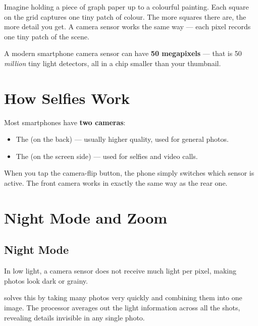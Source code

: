 \begin{picturethis}
  Imagine holding a piece of graph paper up to a colourful painting.
  Each square on the grid captures one tiny patch of colour.
  The more squares there are, the more detail you get.
  A camera sensor works the same way — each pixel records one tiny
  patch of the scene.
\end{picturethis}

\begin{funfact}
  A modern smartphone camera sensor can have \textbf{50 megapixels} —
  that is 50 \emph{million} tiny light detectors, all in a chip smaller
  than your thumbnail.
\end{funfact}

\sectionrule

\section*{How Selfies Work}

Most smartphones have \textbf{two cameras}:
\begin{itemize}
  \item The  (on the back) — usually higher quality, used for general photos.
  \item The  (on the screen side) — used for selfies and video calls.
\end{itemize}

When you tap the camera-flip button, the phone simply switches which sensor
is active. The front camera works in exactly the same way as the rear one.

\sectionrule

\section*{Night Mode and Zoom}

\subsection*{Night Mode}
In low light, a camera sensor does not receive much light per pixel,
making photos look dark or grainy.

 solves this by taking many photos very quickly
and combining them into one image. The processor averages out the
light information across all the shots, revealing details invisible in any single photo.

